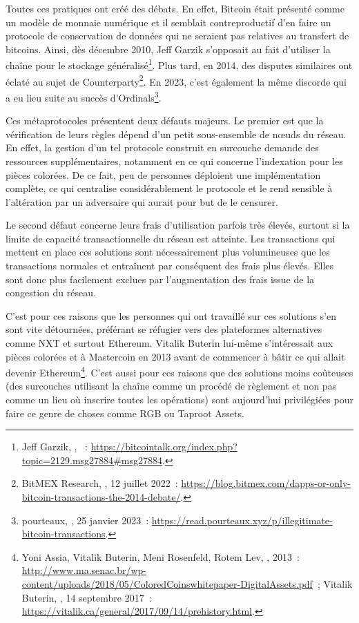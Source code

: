 Toutes ces pratiques ont créé des débats. En effet, Bitcoin était présenté comme un modèle de monnaie numérique et il semblait contreproductif d'en faire un protocole de conservation de données qui ne seraient pas relatives au transfert de bitcoins. Ainsi, dès décembre 2010, Jeff Garzik s'opposait au fait d'utiliser la chaîne pour le stockage généralisé\footnote{Jeff Garzik, , ~: \url{https://bitcointalk.org/index.php?topic=2129.msg27884\#msg27884}.}. Plus tard, en 2014, des disputes similaires ont éclaté au sujet de Counterparty\footnote{BitMEX Research, , 12 juillet 2022~: \url{https://blog.bitmex.com/dapps-or-only-bitcoin-transactions-the-2014-debate/}.}. En 2023, c'est également la même discorde qui a eu lieu suite au succès d'Ordinals\footnote{pourteaux, , 25 janvier 2023~: \url{https://read.pourteaux.xyz/p/illegitimate-bitcoin-transactions}.}.

Ces métaprotocoles présentent deux défauts majeurs. Le premier est que la vérification de leurs règles dépend d'un petit sous-ensemble de nœuds du réseau. En effet, la gestion d'un tel protocole construit en surcouche demande des ressources supplémentaires, notamment en ce qui concerne l'indexation pour les pièces colorées. De ce fait, peu de personnes déploient une implémentation complète, ce qui centralise considérablement le protocole et le rend sensible à l'altération par un adversaire qui aurait pour but de le censurer.

Le second défaut concerne leurs frais d'utilisation parfois très élevés, surtout si la limite de capacité transactionnelle du réseau est atteinte. Les transactions qui mettent en place ces solutions sont nécessairement plus volumineuses que les transactions normales et entraînent par conséquent des frais plus élevés. Elles sont donc plus facilement exclues par l'augmentation des frais issue de la congestion du réseau.

C'est pour ces raisons que les personnes qui ont travaillé sur ces solutions s'en sont vite détournées, préférant se réfugier vers des plateformes alternatives comme NXT et surtout Ethereum. Vitalik Buterin lui-même s'intéressait aux pièces colorées et à Mastercoin en 2013 avant de commencer à bâtir ce qui allait devenir Ethereum\footnote{Yoni Assia, Vitalik Buterin, Meni Rosenfeld, Rotem Lev, , 2013~: \url{http://www.ma.senac.br/wp-content/uploads/2018/05/ColoredCoinswhitepaper-DigitalAssets.pdf}~; Vitalik Buterin, , 14 septembre 2017~: \url{https://vitalik.ca/general/2017/09/14/prehistory.html}.}. C'est aussi pour ces raisons que des solutions moins coûteuses (des surcouches utilisant la chaîne comme un procédé de règlement et non pas comme un lieu où inscrire toutes les opérations) sont aujourd'hui privilégiées pour faire ce genre de choses comme RGB ou Taproot Assets.

